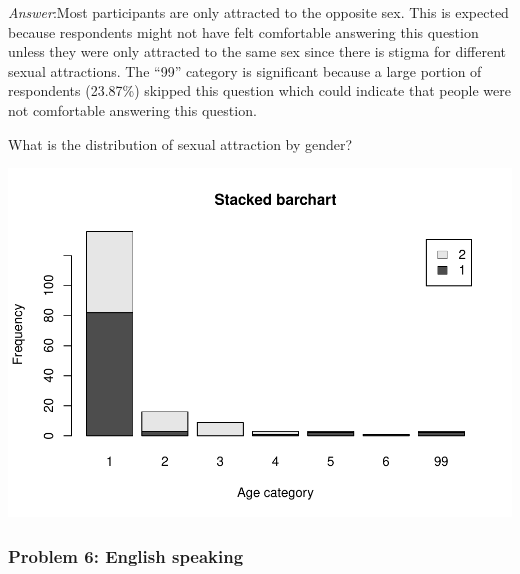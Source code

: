 \documentclass[
]{article}
\newenvironment{Shaded}{\begin{snugshade}}{\end{snugshade}}
\newcommand{\AttributeTok}[1]{\textcolor[rgb]{0.77,0.63,0.00}{#1}}
\newcommand{\ConstantTok}[1]{\textcolor[rgb]{0.00,0.00,0.00}{#1}}
\newcommand{\FunctionTok}[1]{\textcolor[rgb]{0.00,0.00,0.00}{#1}}
\newcommand{\NormalTok}[1]{#1}
\newcommand{\OtherTok}[1]{\textcolor[rgb]{0.56,0.35,0.01}{#1}}
\newcommand{\SpecialCharTok}[1]{\textcolor[rgb]{0.00,0.00,0.00}{#1}}
\newcommand{\StringTok}[1]{\textcolor[rgb]{0.31,0.60,0.02}{#1}}
\begin{document}
\emph{Answer}:Most participants are only attracted to the opposite sex.
This is expected because respondents might not have felt comfortable
answering this question unless they were only attracted to the same sex
since there is stigma for different sexual attractions. The ``99''
category is significant because a large portion of respondents (23.87\%)
skipped this question which could indicate that people were not
comfortable answering this question.

What is the distribution of sexual attraction by gender?

\begin{Shaded}
\end{Shaded}

\includegraphics{Assignments_files/figure-latex/unnamed-chunk-14-1.pdf}

\hypertarget{problem-6-english-speaking}{%
\subsubsection{Problem 6: English
speaking}\label{problem-6-english-speaking}}
\end{document}
